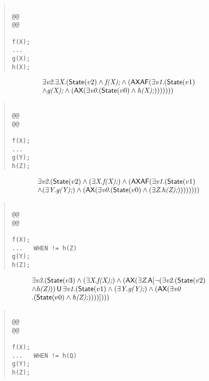 \documentclass{article}
\newcommand{\U}{\,\mbox{\sf{U}}\,}
\newcommand{\A}{\mbox{\sf{A}}}
\newcommand{\AX}{\mbox{\sf{AX}}}
\newcommand{\AF}{\mbox{\sf{AF}}}
\newcommand{\mita}[1]{\mbox{\it{{#1}}}}
\newcommand{\msf}[1]{\mbox{\sf{{#1}}}}
\begin{document}
\begin{quote}\begin{verbatim}

@@
@@

f(X);
...
g(X);
h(X);
\end{verbatim}\end{quote}

\[\begin{array}{l}
\exists \mita{v2} . \exists \mita{X} . (\msf{State}(v2) \wedge \mita{f(X);} \wedge (\AX\AF(\exists \mita{v1} . (\msf{State}(v1)\\ \wedge \mita{g(X);} \wedge (\AX(\exists \mita{v0} . (\msf{State}(v0) \wedge \mita{h(X);})))))))
\end{array}\]

\begin{quote}\begin{verbatim}

@@
@@

f(X);
...
g(Y);
h(Z);
\end{verbatim}\end{quote}

\[\begin{array}{l}
\exists \mita{v2} . (\msf{State}(v2) \wedge (\exists \mita{X} . \mita{f(X);}) \wedge (\AX\AF(\exists \mita{v1} . (\msf{State}(v1)\\ \wedge (\exists \mita{Y} . \mita{g(Y);}) \wedge (\AX(\exists \mita{v0} . (\msf{State}(v0) \wedge (\exists \mita{Z} . \mita{h(Z);}))))))))
\end{array}\]

\begin{quote}\begin{verbatim}

@@
@@

f(X);
...   WHEN != h(Z)
g(Y);
h(Z);
\end{verbatim}\end{quote}

\[\begin{array}{l}
\exists \mita{v3} . (\msf{State}(v3) \wedge (\exists \mita{X} . \mita{f(X);}) \wedge (\AX(\exists \mita{Z} . \A[\neg (\exists \mita{v2} . (\msf{State}(v2)\\ \wedge \mita{h(Z)})) \U \exists \mita{v1} . (\msf{State}(v1) \wedge (\exists \mita{Y} . \mita{g(Y);}) \wedge (\AX(\exists \mita{v0}\\ . (\msf{State}(v0) \wedge \mita{h(Z);}))))]
)))
\end{array}\]

\begin{quote}\begin{verbatim}

@@
@@

f(X);
...   WHEN != h(Q)
g(Y);
h(Z);
\end{verbatim}\end{quote}
\end{document}
